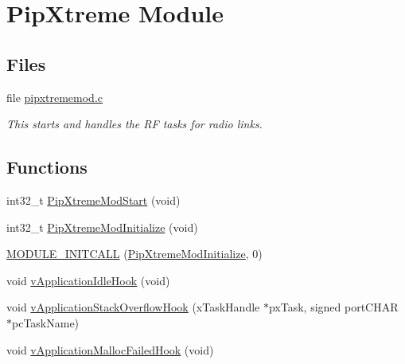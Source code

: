 \hypertarget{group___pip_xtreme_module}{\section{\-Pip\-Xtreme \-Module}
\label{group___pip_xtreme_module}
}
\subsection*{\-Files}
\begin{DoxyCompactItemize}
\item 
file \hyperlink{pipxtrememod_8c}{pipxtrememod.\-c}
\begin{DoxyCompactList}\small\item\em \-This starts and handles the \-R\-F tasks for radio links. \end{DoxyCompactList}\end{DoxyCompactItemize}
\subsection*{\-Functions}
\begin{DoxyCompactItemize}
\item 
int32\-\_\-t \hyperlink{group___pip_xtreme_module_gaf807db07678e4bfa45af98ad2ba88231}{\-Pip\-Xtreme\-Mod\-Start} (void)
\item 
int32\-\_\-t \hyperlink{group___pip_xtreme_module_ga5328319847f8d7b5abec5b91331b7d8b}{\-Pip\-Xtreme\-Mod\-Initialize} (void)
\item 
\hyperlink{group___pip_xtreme_module_ga5d5845e9f2be9cbef331306db953f747}{\-M\-O\-D\-U\-L\-E\-\_\-\-I\-N\-I\-T\-C\-A\-L\-L} (\hyperlink{group___pip_xtreme_module_ga5328319847f8d7b5abec5b91331b7d8b}{\-Pip\-Xtreme\-Mod\-Initialize}, 0)
\item 
void \hyperlink{group___pip_xtreme_module_ga97fd430f36f8b065226e2bff9bad1de5}{v\-Application\-Idle\-Hook} (void)
\item 
void \hyperlink{group___pip_xtreme_module_ga329de0f973fabef8b34da6444654295c}{v\-Application\-Stack\-Overflow\-Hook} (x\-Task\-Handle $\ast$px\-Task, signed port\-C\-H\-A\-R $\ast$pc\-Task\-Name)
\item 
void \hyperlink{group___pip_xtreme_module_gab7e5c95cf72a3f819bc4462a7fb62ca3}{v\-Application\-Malloc\-Failed\-Hook} (void)
\end{DoxyCompactItemize}


